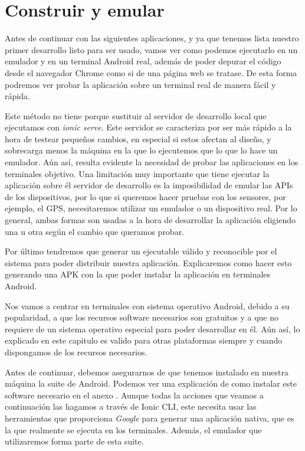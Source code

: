 \clearpage
\section{Construir y emular}

Antes de continuar con las siguientes aplicaciones, y ya que tenemos lista nuestro primer desarrollo listo para ser usado, vamos ver como podemos  ejecutarlo en un emulador y en un terminal Android real, además de poder depurar el código desde el navegador Chrome como si de una página web se tratase. De esta forma podremos ver probar la aplicación sobre un terminal real de manera fácil y rápida.

Este método no tiene porque sustituir al servidor de desarrollo local que ejecutamos con \emph{ionic serve}. Este servidor se caracteriza por ser más rápido a la hora de testear pequeños cambios, en especial si estos afectan al diseño, y sobrecarga menos la máquina en la que lo ejecutemos que lo que lo hace un emulador. Aún así, resulta evidente la necesidad de probar las aplicaciones en los terminales objetivo. Una limitación muy importante que tiene ejecutar la aplicación sobre él servidor de desarrollo es la imposibilidad de emular las \glspl{API} de los dispositivos, por lo que si queremos hacer pruebas con los sensores, por ejemplo, el \gls{GPS}, necesitaremos utilizar un emulador o un dispositivo real. Por lo general, ambas formas son usadas a la hora de desarrollar la aplicación eligiendo una u otra según el cambio que queramos probar.

Por último tendremos que generar un ejecutable válido y reconocible por el sistema para poder distribuir nuestra aplicación. Explicaremos como hacer esto generando una \gls{APK} con la que poder instalar la aplicación en terminales Android.

Nos vamos a centrar en terminales con sistema operativo Android, debido a su popularidad, a que los recursos software necesarios son gratuitos y a que no requiere de un sistema operativo especial para poder desarrollar en él. Aún así, lo explicado en este capitulo es valido para otras plataformas siempre y cuando dispongamos de los recursos necesarios.

Antes de continuar, debemos asegurarnos de que tenemos instalado en nuestra máquina la suite de Android. Podemos ver una explicación de como instalar este software necesario en el anexo . Aunque todas la acciones que veamos a continuación las hagamos a través de Ionic CLI, este necesita usar las herramientas que proporciona \emph{Google} para generar una aplicación nativa, que es la que realmente se ejecuta en los terminales. Además, el emulador que utilizaremos forma parte de esta suite.

